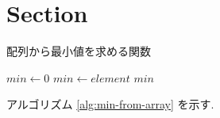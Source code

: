 \documentclass[uplatex, 10pt, a4paper, titlepage,dvipdfmx]{jsarticle}
\begin{document}
\makeatletter
\renewcommand{\ALG@name}{アルゴリズム}
\makeatother

\section{Section}

\begin{algorithm}[tb]
    \caption{配列から最小値を求める関数}
    \label{alg:min-from-array}
    \begin{algorithmic}[1]
        \State $min \gets 0$
        \State $min \gets element$
        \EndIf
        \EndFor
        \State \Return $min$
        \EndFunction
    \end{algorithmic}
\end{algorithm}

アルゴリズム \ref{alg:min-from-array} を示す.

\cite{vaswani2017attention}

{
    \footnotesize
    
}
\end{document}
